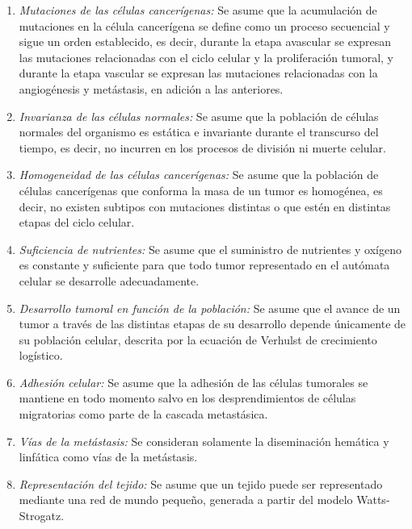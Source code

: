 \documentclass[12pt]{amsart}
\begin{document}
\begin{enumerate}
\item {\it Mutaciones de las c\'elulas cancer\'igenas:} Se asume que la acumulaci\'on de mutaciones en la c\'elula cancer\'igena se define como un proceso secuencial y sigue un orden establecido, es decir, durante la etapa avascular se expresan las mutaciones relacionadas con el ciclo celular y la proliferaci\'on tumoral, y durante la etapa vascular se expresan las mutaciones relacionadas con la angiog\'enesis y met\'astasis, en adici\'on a las anteriores.

\item {\it Invarianza de las c\'elulas normales:} Se asume que la poblaci\'on de c\'elulas normales del organismo es est\'atica e invariante durante el transcurso del tiempo, es decir, no incurren en los procesos de divisi\'on ni muerte celular.

\item {\it Homogeneidad de las c\'elulas cancer\'igenas:} Se asume que la poblaci\'on de c\'elulas cancer\'igenas que conforma la masa de un tumor es homog\'enea, es decir, no existen subtipos con mutaciones distintas o que est\'en en distintas etapas del ciclo celular.

\item {\it Suficiencia de nutrientes:} Se asume que el suministro de nutrientes y ox\'igeno es constante y suficiente para que todo tumor representado en el aut\'omata celular se desarrolle adecuadamente.

\item{\it Desarrollo tumoral en funci\'on de la poblaci\'on:} Se asume que el avance de un tumor a trav\'es de las distintas etapas de su desarrollo depende \'unicamente de su poblaci\'on celular, descrita por la ecuaci\'on de Verhulst de crecimiento log\'istico.

\item  {\it Adhesi\'on celular:} Se asume que la adhesi\'on de las c\'elulas tumorales se mantiene en todo momento salvo en los desprendimientos de c\'elulas migratorias como parte de la cascada metast\'asica.

\item {\it V\'ias de la met\'astasis:} Se consideran solamente la diseminaci\'on hem\'atica y linf\'atica como v\'ias de la met\'astasis.

\item {\it Representaci\'on del tejido:} Se asume que un tejido puede ser representado mediante una red de mundo peque\~no, generada a partir del modelo Watts-Strogatz. %

\end{enumerate}
\newpage
\end{document}
